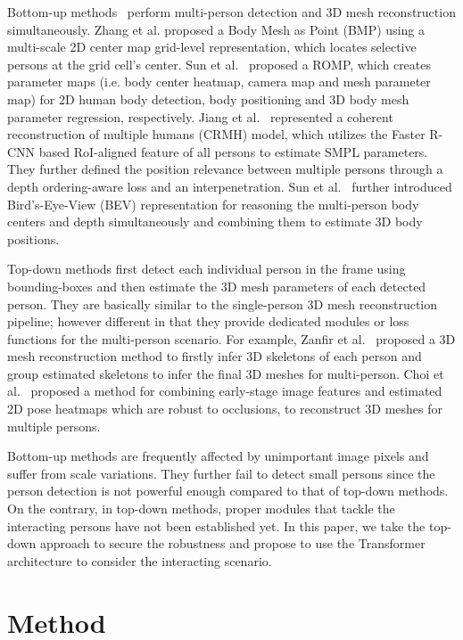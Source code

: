 \documentclass[runningheads]{llncs}
\begin{document}
Bottom-up methods~\cite{jiang2020coherent,sun2021monocular,sun2021putting,zhang2021body} perform multi-person detection and 3D mesh reconstruction simultaneously. Zhang et al. \cite{zhang2021body} proposed a Body Mesh as Point (BMP) using a multi-scale 2D center map grid-level representation, which locates selective persons at the  grid cell's center. Sun et al.~\cite{sun2021monocular} proposed a ROMP, which creates parameter maps (i.e. body center heatmap, camera map and mesh parameter map) for 2D human body detection, body positioning and 3D body mesh parameter regression, respectively. Jiang et al.~\cite{jiang2020coherent} represented a coherent reconstruction of multiple humans (CRMH) model, which utilizes the Faster R-CNN based RoI-aligned feature of all persons to estimate SMPL parameters. They further defined the position relevance between multiple persons through a depth ordering-aware loss and an interpenetration. Sun et al.~\cite{sun2021putting} further introduced Bird’s-Eye-View (BEV) representation for reasoning the multi-person body centers and depth simultaneously and combining them to estimate 3D body positions. 

Top-down methods \cite{choi20213Dcrowdnet,zanfir2018deep} first detect each individual person in the frame using bounding-boxes and then estimate the 3D mesh parameters of each detected person. They are basically similar to the single-person 3D mesh reconstruction pipeline; however different in that they provide dedicated modules or loss functions for the multi-person scenario. For example, Zanfir et al.~\cite{zanfir2018deep} proposed a 3D mesh reconstruction method to firstly infer 3D skeletons of each person and group estimated skeletons to infer the final 3D meshes for multi-person. Choi et al.~\cite{choi20213Dcrowdnet} proposed a method for combining early-stage image features and estimated 2D pose heatmaps which are robust to occlusions, to reconstruct 3D meshes for multiple persons.

Bottom-up methods are frequently affected by unimportant image pixels and suffer from scale variations. They further fail to detect small persons since the person detection is not powerful enough compared to that of top-down methods. On the contrary, in top-down methods, proper modules that tackle the interacting persons have not been established yet. In this paper, we take the top-down approach to secure the robustness and propose to use the Transformer architecture to consider the interacting scenario.

\section{Method}
\end{document}
